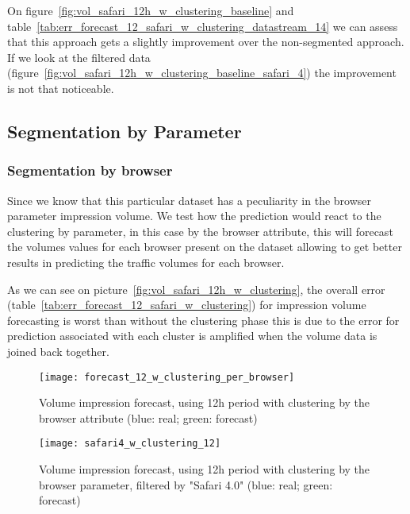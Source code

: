 On figure~\ref{fig:vol_safari_12h_w_clustering_baseline} and table~\ref{tab:err_forecast_12_safari_w_clustering_datastream_14}
we can assess that this approach gets a slightly improvement over the
non-segmented approach. If we look at the filtered data
(figure~\ref{fig:vol_safari_12h_w_clustering_baseline_safari_4}) the improvement
is not that noticeable.


\subsection*{Segmentation by Parameter}

\subsubsection*{Segmentation by browser}

Since we know that this particular dataset has a peculiarity in the browser
parameter impression volume. We test how the prediction would react to the clustering by
parameter, in this case by the browser attribute, this will forecast the volumes
values for each browser present on the dataset allowing to get better results in
predicting the traffic volumes for each browser.

As we can see on picture~\ref{fig:vol_safari_12h_w_clustering}, the overall error
(table~\ref{tab:err_forecast_12_safari_w_clustering}) for impression volume
forecasting is worst than without the clustering phase this is due to the error
for prediction associated with each cluster is amplified when the volume data is joined
back together.

\begin{figure}[!ht]
\centering
\begin{minipage}[b]{0.45\linewidth}
\texttt{[image: forecast\_12\_w\_clustering\_per\_browser]} \caption[Volume
impression forecast, safari 4]{Volume impression
forecast, using 12h period with clustering by the browser attribute (blue: real; green: forecast)}
\label{fig:vol_safari_12h_w_clustering}
\end{minipage}
\quad
\begin{minipage}[b]{0.45\linewidth}
\texttt{[image: safari4\_w\_clustering\_12]} \caption[Volume
impression forecast, safari 4]{Volume impression
forecast, using 12h period with clustering by the browser parameter, filtered by "Safari 4.0" (blue: real; green: forecast)}
\label{fig:vol_safari_12h_w_clustering_safari_4}
\end{minipage}

\end{figure}

